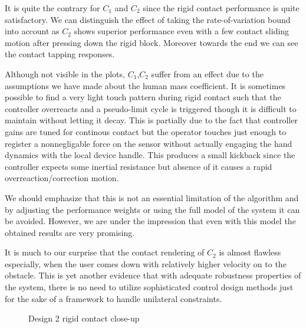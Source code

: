 It is quite the contrary for $C_1$ and $C_2$ since the rigid contact performance is quite satisfactory. We can distinguish the effect of 
taking the rate-of-variation bound into account as $C_2$ shows superior performance even with a few contact sliding
motion after pressing down the rigid block. Moreover towards the end we can see the contact tapping responses.


Although not visible in the plots, $C_1$,$C_2$ suffer from an effect due to the assumptions we have made about the human mass coefficient.
It is sometimes possible to find a very light touch pattern during rigid contact such that the controller overreacts and a pseudo-limit
cycle is triggered though it is difficult to maintain without letting it decay. This is partially due to the fact that controller gains 
are tuned for continous contact but the operator touches just enough to register a nonnegligable force on the sensor without actually
engaging the hand dynamics with the local device handle. This produces a small kickback since the controller expects some inertial 
resistance but absence of it causes a rapid overreaction/correction motion.

We should emphasize that this is not an essential limitation of the algorithm and by adjusting the performance weights or using the 
full model of the system it can be avoided. However, we are under the impression that even with this model the obtained results are 
very promising. 

It is much to our surprise that the contact rendering of $C_2$ is almost flawless especially, when the user comes down with relatively 
higher velocity on to the obstacle. This is yet another evidence that with adequate robustness
properties of the system, there is no need to utilize sophisticated control design methods just for the sake of a framework to handle 
unilateral constraints.

\begin{figure}%
\centering
{}
\caption{Design 2 rigid contact close-up}%
\label{fig:app:design2rigidcloseup}%
\end{figure}



